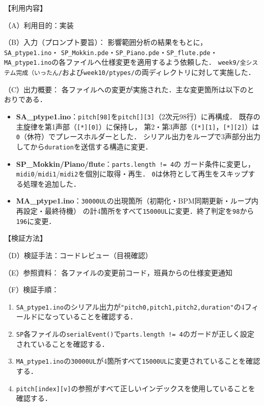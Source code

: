 \documentclass[uplatex,dvipdfmx]{jlreq}
\newcounter{aibox}
\begin{document}
\begin{tcolorbox}[title = AI利用内容2：5ファイルへの仕様変更適用, arc=3mm, colback=white, breakable]
    \label{usingAI2}
    【利用内容】

     （A）利用目的：実装

     （B）入力（プロンプト要旨）：
     影響範囲分析の結果をもとに，\texttt{SA\_ptype1.ino}・
     \texttt{SP\_Mokkin.pde}・\texttt{SP\_Piano.pde}・\texttt{SP\_flute.pde}・
     \texttt{MA\_ptype1.ino}の各ファイルへ仕様変更を適用するよう依頼した．
     \texttt{week9/全システム完成（いったん/}および\texttt{week10/ptypes/}の両ディレクトリに対して実施した．

     （C）出力概要：
     各ファイルへの変更が実施された．主な変更箇所は以下のとおりである．
     \begin{itemize}
       \item \textbf{SA\_ptype1.ino}：\texttt{pitch[98]}を\texttt{pitch[][3]}（2次元98行）に再構成．
             既存の主旋律を第1声部（\texttt{[*][0]}）に保持し，
             第2・第3声部（\texttt{[*][1]}，\texttt{[*][2]}）は\texttt{0}（休符）でプレースホルダーとした．
             シリアル出力をループで3声部分出力してから\texttt{duration}を送信する構造に変更．
       \item \textbf{SP\_Mokkin/Piano/flute}：\texttt{parts.length != 4}の
             ガード条件に変更し，\texttt{midi0}/\texttt{midi1}/\texttt{midi2}を個別に取得・再生．
             \texttt{0}は休符として再生をスキップする処理を追加した．
       \item \textbf{MA\_ptype1.ino}：\texttt{30000UL}の出現箇所（初期化・BPM同期更新・ループ内再設定・最終待機）
             の計4箇所をすべて\texttt{15000UL}に変更．終了判定を\texttt{98}から\texttt{196}に変更．
     \end{itemize}

    【検証方法】

     （D）検証手法：コードレビュー（目視確認）

     （E）参照資料：
     各ファイルの変更前コード，班員からの仕様変更通知

     （F）検証手順：
     \begin{enumerate}
       \item \texttt{SA\_ptype1.ino}のシリアル出力が\texttt{"pitch0,pitch1,pitch2,duration"}の4フィールドになっていることを確認する．
       \item \texttt{SP}各ファイルの\texttt{serialEvent()}で\texttt{parts.length != 4}のガードが正しく設定されていることを確認する．
       \item \texttt{MA\_ptype1.ino}の\texttt{30000UL}が4箇所すべて\texttt{15000UL}に変更されていることを確認する．
       \item \texttt{pitch[index][v]}の参照がすべて正しいインデックスを使用していることを確認する．
     \end{enumerate}


\end{tcolorbox}
\end{document}
